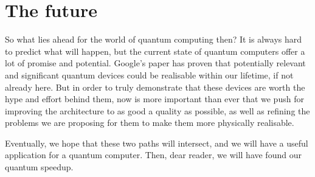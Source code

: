 \section{The future}

So what lies ahead for the world of quantum computing then? It is always hard to predict what will happen, but the current state of quantum computers offer a lot of promise and potential. Google's paper has proven that potentially relevant and significant quantum devices could be realisable within our lifetime, if not already here. But in order to truly demonstrate that these devices are worth the hype and effort behind them, now is more important than ever that we push for improving the architecture to as good a quality as possible, as well as refining the problems we are proposing for them to make them more physically realisable.

Eventually, we hope that these two paths will intersect, and we will have a useful application for a quantum computer. Then, dear reader, we will have found our quantum speedup.
